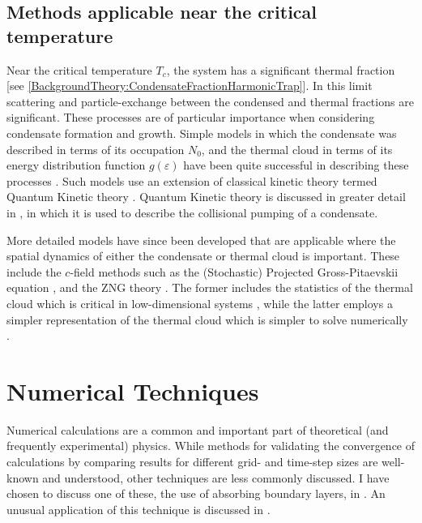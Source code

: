 \subsection{Methods applicable near the critical temperature}

Near the critical temperature $T_c$, the system has a significant thermal fraction [see \eqref{BackgroundTheory:CondensateFractionHarmonicTrap}].  In this limit scattering and particle-exchange between the condensed and thermal fractions are significant.  These processes are of particular importance when considering condensate formation and growth.  Simple models in which the condensate was described in terms of its occupation $N_0$, and the thermal cloud in terms of its energy distribution function $g(\varepsilon)$ have been quite successful in describing these processes \citep{Davis:2000vn,Bijlsma:2000}.  Such models use an extension of classical kinetic theory termed Quantum Kinetic theory \citep{Gardiner:1997tz,Jaksch:1997ug,Gardiner:1998wx,Jaksch:1998sj,Gardiner:2000ug,Lee:2000vs,Davis:2000vn}.  Quantum Kinetic theory is discussed in greater detail in , in which it is used to describe the collisional pumping of a condensate.

More detailed models have since been developed that are applicable where the spatial dynamics of either the condensate or thermal cloud is important.  These include the $c$-field methods such as the (Stochastic) Projected Gross-Pitaevskii equation \citep{Blakie:2008a}, and the ZNG theory \citep{Zaremba:1999,Proukakis:2008}.  The former includes the statistics of the thermal cloud which is critical in low-dimensional systems \citep{Blakie:2008a}, while the latter employs a simpler representation of the thermal cloud which is simpler to solve numerically \citep{Proukakis:2008}.

\section{Numerical Techniques}
\label{BackgroundTheory:NumericalTechniques}

Numerical calculations are a common and important part of theoretical (and frequently experimental) physics.  While methods for validating the convergence of calculations by comparing results for different grid- and time-step sizes are well-known and understood, other techniques are less commonly discussed.  I have chosen to discuss one of these, the use of absorbing boundary layers, in .  An unusual application of this technique is discussed in .

